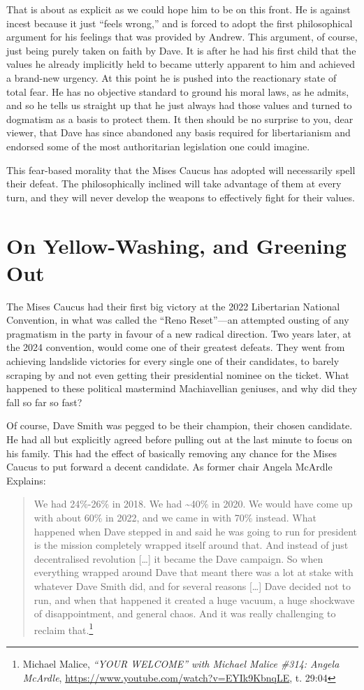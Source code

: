 \documentclass[11pt]{article}
\begin{document}
That is about as explicit as we could hope him to be on this front. He is against incest because it just ``feels wrong,'' and is forced to adopt the first philosophical argument for his feelings that was provided by Andrew. This argument, of course, just being purely taken on faith by Dave. It is after he had his first child that the values he already implicitly held to became utterly apparent to him and achieved a brand-new urgency. At this point he is pushed into the reactionary state of total fear. He has no objective standard to ground his moral laws, as he admits, and so he tells us straight up that he just always had those values and turned to dogmatism as a basis to protect them. It then should be no surprise to you, dear viewer, that Dave has since abandoned any basis required for libertarianism and endorsed some of the most authoritarian legislation one could imagine.

This fear-based morality that the Mises Caucus has adopted will necessarily spell their defeat. The philosophically inclined will take advantage of them at every turn, and they will never develop the weapons to effectively fight for their values.
\section{On Yellow-Washing, and Greening Out}
\label{sec:orgf6b7e17}
The Mises Caucus had their first big victory at the 2022 Libertarian National Convention, in what was called the ``Reno Reset''---an attempted ousting of any pragmatism in the party in favour of a new radical direction. Two years later, at the 2024 convention, would come one of their greatest defeats. They went from achieving landslide victories for every single one of their candidates, to barely scraping by and not even getting their presidential nominee on the ticket. What happened to these political mastermind Machiavellian geniuses, and why did they fall so far so fast?

Of course, Dave Smith was pegged to be their champion, their chosen candidate. He had all but explicitly agreed before pulling out at the last minute to focus on his family. This had the effect of basically removing any chance for the Mises Caucus to put forward a decent candidate. As former chair Angela McArdle Explains:
\begin{quote}
We had 24\%-26\% in 2018. We had \textasciitilde{}40\% in 2020. We would have come up with about 60\% in 2022, and we came in with 70\% instead. What happened when Dave stepped in and said he was going to run for president is the mission completely wrapped itself around that. And instead of just decentralised revolution [\ldots{}] it became the Dave campaign. So when everything wrapped around Dave that meant there was a lot at stake with whatever Dave Smith did, and for several reasons [\ldots{}] Dave decided not to run, and when that happened it created a huge vacuum, a huge shockwave of disappointment, and general chaos. And it was really challenging to reclaim that.\footnote{Michael Malice, \emph{``YOUR WELCOME'' with Michael Malice \#314: Angela McArdle}, \url{https://www.youtube.com/watch?v=EYIk9KbnqLE}, t. 29:04}
\end{quote}
\end{document}
